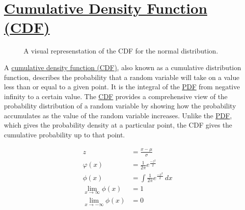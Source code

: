 \documentclass[
  a4paper,
]{scrbook}
\begin{document}
\section{\texorpdfstring{\hyperref[acronyms_CDF]{Cumulative Density
Function (CDF)}}{Cumulative Density Function (CDF)}}\label{section-4}

\begin{figure}[ht]


\caption{\label{fig-cdf-000-scr}A visual represenstation of the CDF for
the normal distribution.}

\end{figure}%

A \hyperref[CDF]{cumulative density function (CDF)}, also known as a
cumulative distribution function, describes the probability that a
random variable will take on a value less than or equal to a given
point. It is the integral of the \hyperref[acronyms_PDF]{PDF} from
negative infinity to a certain value. The \hyperref[acronyms_CDF]{CDF}
provides a comprehensive view of the probability distribution of a
random variable by showing how the probability accumulates as the value
of the random variable increases. Unlike the
\hyperref[acronyms_PDF]{PDF}, which gives the probability density at a
particular point, the CDF gives the cumulative probability up to that
point.

\begin{align}
z &= \frac{x-\mu}{\sigma} \nonumber \\
\varphi(x) &= \frac{1}{2\pi}e^{\frac{-z^2}{2}} \\
\phi(x)& = \int \frac{1}{2\pi}e^{\frac{-x^2}{2}} \, dx \\
\lim_{x\to\infty} \phi(x) &= 1 \nonumber \\
\lim_{x\to - \infty} \phi(x) &= 0 \nonumber
\end{align}
\end{document}
